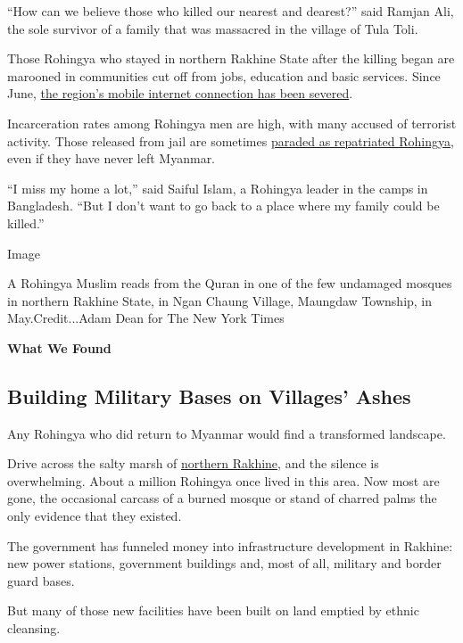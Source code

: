 ``How can we believe those who killed our nearest and dearest?'' said
Ramjan Ali, the sole survivor of a family that was massacred in the
village of Tula Toli.

Those Rohingya who stayed in northern Rakhine State after the killing
began are marooned in communities cut off from jobs, education and basic
services. Since June,
\href{https://www.nytimes3xbfgragh.onion/2019/07/02/world/asia/internet-shutdown-myanmar-rakhine.html}{the
region's mobile internet connection has been severed}.

Incarceration rates among Rohingya men are high, with many accused of
terrorist activity. Those released from jail are sometimes
\href{https://www.nytimes3xbfgragh.onion/2018/08/02/world/asia/myanmar-rohingya-rakhine.html}{paraded
as repatriated Rohingya}, even if they have never left Myanmar.

``I miss my home a lot,'' said Saiful Islam, a Rohingya leader in the
camps in Bangladesh. ``But I don't want to go back to a place where my
family could be killed.''

Image

A Rohingya Muslim reads from the Quran in one of the few undamaged
mosques in northern Rakhine State, in Ngan Chaung Village, Maungdaw
Township, in May.Credit...Adam Dean for The New York Times

\textbf{What We Found}

\hypertarget{building-military-bases-on-villages-ashes}{%
\subsection{Building Military Bases on Villages'
Ashes}\label{building-military-bases-on-villages-ashes}}

Any Rohingya who did return to Myanmar would find a transformed
landscape.

Drive across the salty marsh of
\href{https://www.nytimes3xbfgragh.onion/2018/08/02/world/asia/myanmar-rohingya-rakhine.html}{northern
Rakhine}, and the silence is overwhelming. About a million Rohingya once
lived in this area. Now most are gone, the occasional carcass of a
burned mosque or stand of charred palms the only evidence that they
existed.

The government has funneled money into infrastructure development in
Rakhine: new power stations, government buildings and, most of all,
military and border guard bases.

But many of those new facilities have been built on land emptied by
ethnic cleansing.

